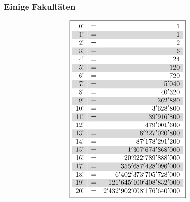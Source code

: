 \subsubsection{Einige Fakultäten}
\[ \boxed{\begin{array}{rcr}
\rowcolor{white}  0!&=&1\\
\rowcolor{lgray}  1!&=&1\\
\rowcolor{white}  2!&=&2\\
\rowcolor{lgray}  3!&=&6\\
\rowcolor{white}  4!&=&24\\
\rowcolor{lgray}  5!&=&120\\
\rowcolor{white}  6!&=&720\\
\rowcolor{lgray}  7!&=&5'040\\
\rowcolor{white}  8!&=&40'320\\
\rowcolor{lgray}  9!&=&362'880\\
\rowcolor{white} 10!&=&3'628'800\\
\rowcolor{lgray} 11!&=&39'916'800\\
\rowcolor{white} 12!&=&479'001'600\\
\rowcolor{lgray} 13!&=&6'227'020'800\\
\rowcolor{white} 14!&=&87'178'291'200\\
\rowcolor{lgray} 15!&=&1'307'674'368'000\\
\rowcolor{white} 16!&=&20'922'789'888'000\\
\rowcolor{lgray} 17!&=&355'687'428'096'000\\
\rowcolor{white} 18!&=&6'402'373'705'728'000\\
\rowcolor{lgray} 19!&=&121'645'100'408'832'000\\
\rowcolor{white} 20!&=&2'432'902'008'176'640'000\\
\end{array}}\]

